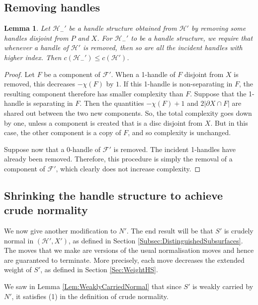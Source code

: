 \documentclass[oneside]{amsart}
\numberwithin{equation}{section}
\theoremstyle{plain}
\newtheorem{lemma}[equation]{Lemma}
\theoremstyle{definition}
\begin{document}
\subsection{Removing handles}

\begin{lemma}
\label{Lem:ComplexityRemovingHandles}
Let $\mathcal{H}_-'$ be a handle structure obtained from $\mathcal{H}'$
by removing some handles disjoint from $P$ and $X$. For $\mathcal{H}_-'$ to be a handle structure, we require that whenever a
handle of $\mathcal{H}'$ is removed, then so are all the incident handles with higher index. Then
$c(\mathcal{H}_-') \leq c(\mathcal{H}')$.
\end{lemma}

\begin{proof}
Let $F$ be a component of $\mathcal{F}'$.
When a 1-handle of $F$ disjoint from $X$ is removed, this decreases $-\chi(F)$ by $1$.
If this 1-handle is non-separating in $F$, the resulting component therefore has smaller complexity than $F$.
Suppose that the 1-handle is separating in $F$. Then the quantities $ -\chi(F) + 1$ and
$2 |\partial X \cap F|$ are shared out between the two
new components. So, the total complexity goes down by one, unless a component is
created that is a disc disjoint from $X$. But in this case, the other component
is a copy of $F$, and so complexity is unchanged. 

Suppose now that a 0-handle of $\mathcal{F}'$ is removed. The incident 1-handles have already been removed.
Therefore, this procedure is simply the removal of a component of $\mathcal{F}'$, which clearly does not increase
complexity.
\end{proof}



\subsection{Shrinking the handle structure to achieve crude normality}

We now give another modification to $N'$. 
The end result will be that $S'$ is crudely normal in $(\mathcal{H}', X')$, as defined in Section \ref{Subsec:DistinguishedSubsurfaces}.
The moves that we make are versions of the
usual normalisation moves and hence are guaranteed to terminate. More precisely, 
each move decreases the extended weight of $S'$, as defined in Section \ref{Sec:WeightHS}.

We saw in Lemma \ref{Lem:WeaklyCarriedNormal} that since $S'$ is weakly carried by $N'$, it satisfies (1) in the definition of
crude normality.
\end{document}

